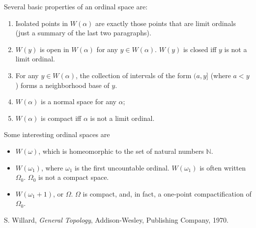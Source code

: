 \documentclass[12pt]{article}
\begin{document}
Several basic properties of an ordinal space are: 
\begin{enumerate}
\item
Isolated points in $W(\alpha)$ are exactly those points that are limit ordinals (just a summary of the last two paragraphs).
\item
$W(y)$ is open in $W(\alpha)$ for any $y\in W(\alpha)$.  $W(y)$ is closed iff $y$ is not a limit ordinal.
\item
For any $y\in W(\alpha)$, the collection of intervals of the form $(a,y]$ (where $a<y$) forms a neighborhood base of $y$.
\item
$W(\alpha)$ is a normal space for any $\alpha$; 
\item
$W(\alpha)$ is compact iff $\alpha$ is not a limit ordinal.
\end{enumerate}

Some interesting ordinal spaces are 
\begin{itemize}
\item
$W(\omega)$, which is homeomorphic to the set of natural numbers $\mathbb{N}$.
\item
$W(\omega_1)$, where $\omega_1$ is the first uncountable ordinal.  $W(\omega_1)$ is often written $\Omega_0$.  $\Omega_0$ is not a compact space.
\item
$W(\omega_1+1)$, or $\Omega$.  $\Omega$ is compact, and, in fact, a one-point compactification of $\Omega_0$.
\end{itemize}

\begin{thebibliography}{9}
 S. Willard, \emph{General Topology}, Addison-Wesley, Publishing Company, 1970.
\end{thebibliography}
\end{document}

